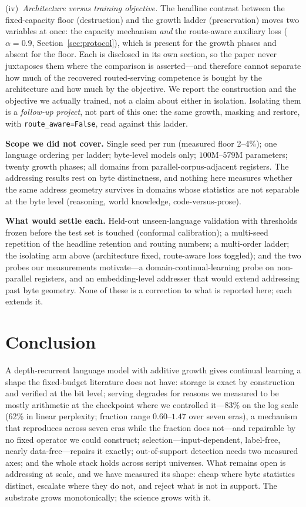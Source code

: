 \documentclass[11pt]{article}
\theoremstyle{definition}\newtheorem{definition}{Definition}
\theoremstyle{remark}\newtheorem{remark}{Remark}
\begin{document}
(iv)~\emph{Architecture versus training objective.} The headline contrast between the
fixed-capacity floor (destruction) and the growth ladder (preservation) moves two
variables at once: the capacity mechanism \emph{and} the route-aware auxiliary loss
($\alpha=0.9$, Section~\ref{sec:protocol}), which is present for the growth phases and
absent for the floor. Each is disclosed in its own section, so the paper never juxtaposes
them where the comparison is asserted---and therefore cannot separate how much of the
recovered routed-serving competence is bought by the architecture and how much by the
objective. We report the construction and the objective we actually trained, not a claim
about either in isolation. Isolating them is a \emph{follow-up project}, not part of this
one: the same growth, masking and restore, with \texttt{route\_aware=False}, read against
this ladder.

\textbf{Scope we did not cover.} Single seed per run (measured floor 2--4\%); one
language ordering per ladder; byte-level models only; $100$M--$579$M parameters; twenty
growth phases; all domains from parallel-corpus-adjacent registers. The addressing results
rest on byte distinctness, and nothing here measures whether the same address geometry
survives in domains whose statistics are not separable at the byte level (reasoning, world
knowledge, code-versus-prose).

\textbf{What would settle each.} Held-out unseen-language validation with thresholds
frozen before the test set is touched (conformal calibration); a multi-seed repetition of
the headline retention and routing numbers; a multi-order ladder; the isolating arm above
(architecture fixed, route-aware loss toggled); and the two probes our measurements motivate---a domain-continual-learning probe on non-parallel registers, and
an embedding-level addresser that would extend addressing past byte geometry. None of
these is a correction to what is reported here; each extends it.

\section{Conclusion}
\label{sec:conclusion}

A depth-recurrent language model with additive growth gives continual learning a shape
the fixed-budget literature does not have: storage is exact by construction and verified
at the bit level; serving degrades for reasons we measured to be mostly arithmetic at the checkpoint where we
controlled it---83\% on the log scale (62\% in linear perplexity; fraction range $0.60$--$1.47$ over seven eras), a mechanism that reproduces across seven eras
while the fraction does not---and repairable by no fixed operator we could construct; selection---input-dependent,
label-free, nearly data-free---repairs it exactly; out-of-support detection needs two
measured axes; and the whole stack holds across script universes. What remains open is
addressing at scale, and we have measured its shape: cheap where byte statistics
distinct, escalate where they do not, and reject what is not in support. The substrate
grows monotonically; the science grows with it.
\end{document}

